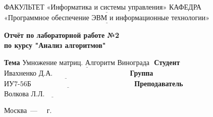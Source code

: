 \begin{titlepage}
	
	\noindent ФАКУЛЬТЕТ $\underline{\text{«Информатика и системы управления»}}$ \newline\newline
	\noindent КАФЕДРА $\underline{\text{«Программное обеспечение ЭВМ и информационные технологии»}}$\newline\newline\newline\newline\newline\newline\newline
	
	\vspace{\baselineskip}

	\begin{center}
		\noindent\begin{minipage}{0.71\textwidth}\centering
			\Large\textbf{Отчёт по лабораторной работе №2\\по курсу "Анализ алгоритмов"}\newline\newline
		\end{minipage}
	\end{center}

	\noindent\textbf{Тема} $\underline{\text{Умножение матриц. Алгоритм Винограда~}}$\newline\newline\newline
	\noindent\textbf{Студент} $\underline{\text{Ивахненко Д.А.~~~~~~~~~~~~~~~~~~~~~~~~~~~~~~~~}}$\newline\newline
	\noindent\textbf{Группа} $\underline{\text{ИУ7-56Б~~~~~~~~~~~~~~~~~~~~~~~~~~~~~~~~~~~~~~~~~~~}}$\newline\newline
	\noindent\textbf{Преподаватель} $\underline{\text{Волкова Л.Л.~~~~~~~~~~~~~~~~~~~~~~~~}}$\newline
	
	\begin{center}
		\vfill
		Москва~---~\the\year
		~г.
	\end{center}
 \restoregeometry
\end{titlepage}